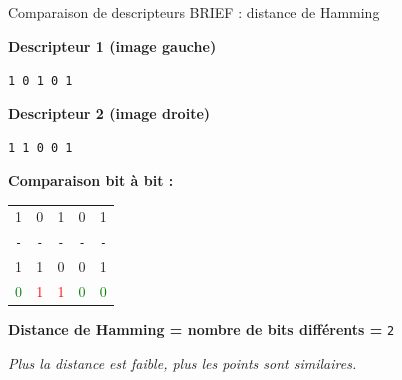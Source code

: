 \begin{frame}{Comparaison de descripteurs BRIEF : distance de Hamming}
\centering
\small

\textbf{Descripteur 1 (image gauche)} \par
\texttt{1 0 1 0 1}
\pause

\vspace{0.5em}
\textbf{Descripteur 2 (image droite)} \par
\texttt{1 1 0 0 1}
\pause

\vspace{1em}
\textbf{Comparaison bit à bit :}\\[0.5em]
\begin{tabular}{c c c c c}
1 & 0 & 1 & 0 & 1 \\
\texttt{\color{gray}-} & \texttt{\color{gray}-} & \texttt{\color{gray}-} & \texttt{\color{gray}-} & \texttt{\color{gray}-} \\
1 & 1 & 0 & 0 & 1 \\
\hline
\textcolor{green}{0} & \textcolor{red}{1} & \textcolor{red}{1} & \textcolor{green}{0} & \textcolor{green}{0}
\end{tabular}
\pause

\vspace{1em}
\textbf{Distance de Hamming = nombre de bits différents = } \texttt{2}
\pause

\vspace{1em}
\textit{Plus la distance est faible, plus les points sont similaires.}

\end{frame}

